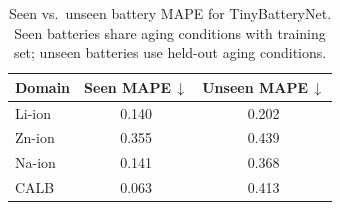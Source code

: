 \begin{table}[t]
\centering
\caption{Seen vs.\ unseen battery MAPE for TinyBatteryNet. Seen batteries share aging conditions with training set; unseen batteries use held-out aging conditions.}
\label{tab:seen_unseen}
\begin{tabular*}{\tblwidth}{@{}LCC@{}}
\toprule
\textbf{Domain} & \textbf{Seen MAPE\,$\downarrow$} & \textbf{Unseen MAPE\,$\downarrow$} \\
\midrule
Li-ion & 0.140 & 0.202 \\
Zn-ion & 0.355 & 0.439 \\
Na-ion & 0.141 & 0.368 \\
CALB & 0.063 & 0.413 \\
\bottomrule
\end{tabular*}
\end{table}